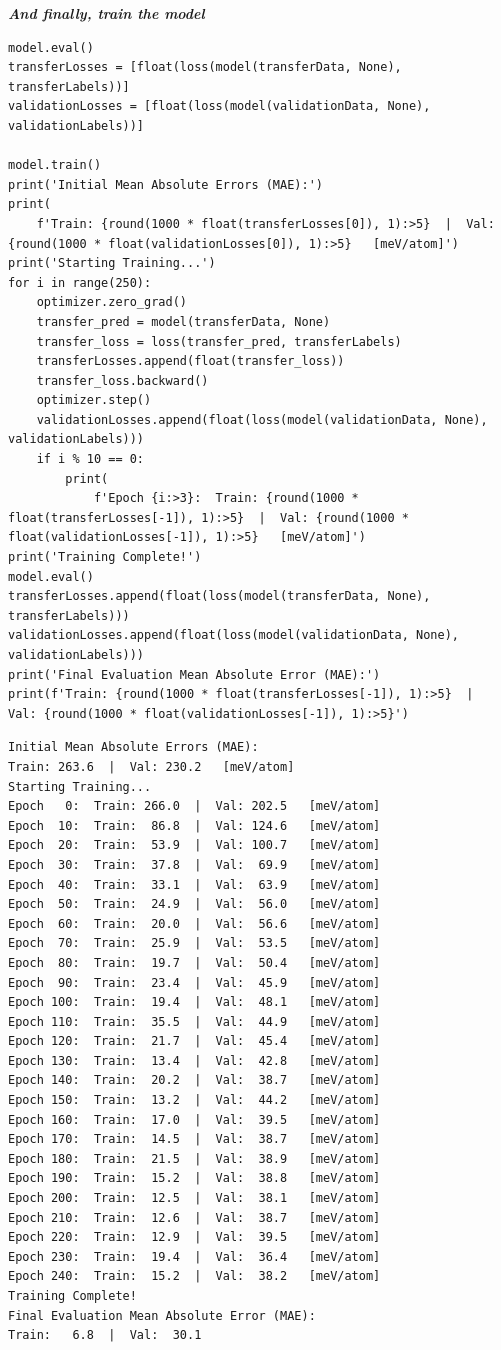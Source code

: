 \textbf{\emph{And finally, train the model}}

\begin{verbatim}
model.eval()
transferLosses = [float(loss(model(transferData, None), transferLabels))]
validationLosses = [float(loss(model(validationData, None), validationLabels))]

model.train()
print('Initial Mean Absolute Errors (MAE):')
print(
    f'Train: {round(1000 * float(transferLosses[0]), 1):>5}  |  Val: {round(1000 * float(validationLosses[0]), 1):>5}   [meV/atom]')
print('Starting Training...')
for i in range(250):
    optimizer.zero_grad()
    transfer_pred = model(transferData, None)
    transfer_loss = loss(transfer_pred, transferLabels)
    transferLosses.append(float(transfer_loss))
    transfer_loss.backward()
    optimizer.step()
    validationLosses.append(float(loss(model(validationData, None), validationLabels)))
    if i % 10 == 0:
        print(
            f'Epoch {i:>3}:  Train: {round(1000 * float(transferLosses[-1]), 1):>5}  |  Val: {round(1000 * float(validationLosses[-1]), 1):>5}   [meV/atom]')
print('Training Complete!')
model.eval()
transferLosses.append(float(loss(model(transferData, None), transferLabels)))
validationLosses.append(float(loss(model(validationData, None), validationLabels)))
print('Final Evaluation Mean Absolute Error (MAE):')
print(f'Train: {round(1000 * float(transferLosses[-1]), 1):>5}  |  Val: {round(1000 * float(validationLosses[-1]), 1):>5}')
\end{verbatim}

\begin{verbatim}
Initial Mean Absolute Errors (MAE):
Train: 263.6  |  Val: 230.2   [meV/atom]
Starting Training...
Epoch   0:  Train: 266.0  |  Val: 202.5   [meV/atom]
Epoch  10:  Train:  86.8  |  Val: 124.6   [meV/atom]
Epoch  20:  Train:  53.9  |  Val: 100.7   [meV/atom]
Epoch  30:  Train:  37.8  |  Val:  69.9   [meV/atom]
Epoch  40:  Train:  33.1  |  Val:  63.9   [meV/atom]
Epoch  50:  Train:  24.9  |  Val:  56.0   [meV/atom]
Epoch  60:  Train:  20.0  |  Val:  56.6   [meV/atom]
Epoch  70:  Train:  25.9  |  Val:  53.5   [meV/atom]
Epoch  80:  Train:  19.7  |  Val:  50.4   [meV/atom]
Epoch  90:  Train:  23.4  |  Val:  45.9   [meV/atom]
Epoch 100:  Train:  19.4  |  Val:  48.1   [meV/atom]
Epoch 110:  Train:  35.5  |  Val:  44.9   [meV/atom]
Epoch 120:  Train:  21.7  |  Val:  45.4   [meV/atom]
Epoch 130:  Train:  13.4  |  Val:  42.8   [meV/atom]
Epoch 140:  Train:  20.2  |  Val:  38.7   [meV/atom]
Epoch 150:  Train:  13.2  |  Val:  44.2   [meV/atom]
Epoch 160:  Train:  17.0  |  Val:  39.5   [meV/atom]
Epoch 170:  Train:  14.5  |  Val:  38.7   [meV/atom]
Epoch 180:  Train:  21.5  |  Val:  38.9   [meV/atom]
Epoch 190:  Train:  15.2  |  Val:  38.8   [meV/atom]
Epoch 200:  Train:  12.5  |  Val:  38.1   [meV/atom]
Epoch 210:  Train:  12.6  |  Val:  38.7   [meV/atom]
Epoch 220:  Train:  12.9  |  Val:  39.5   [meV/atom]
Epoch 230:  Train:  19.4  |  Val:  36.4   [meV/atom]
Epoch 240:  Train:  15.2  |  Val:  38.2   [meV/atom]
Training Complete!
Final Evaluation Mean Absolute Error (MAE):
Train:   6.8  |  Val:  30.1
\end{verbatim}

